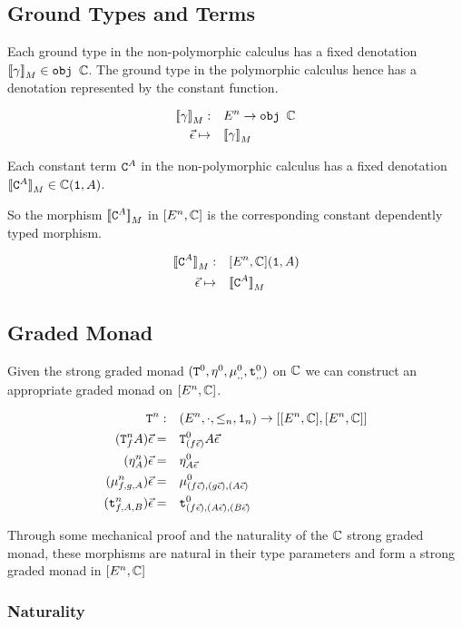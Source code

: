 \documentclass{report}
\begin{document}
\subsection{Ground Types and Terms}
Each ground type in the non-polymorphic calculus has a fixed denotation ${\bf [\![}\gamma{\bf ]\!]}_M\in\texttt{obj }\mathbb{C}$. The ground type in the polymorphic calculus hence has a denotation represented by the constant function.

\begin{align}
    {\bf [\![}\gamma{\bf ]\!]}_M:&\quad E^n\rightarrow \texttt{obj }\mathbb{C}\\
    \vec{\epsilon} \mapsto&\quad  {\bf [\![}\gamma{\bf ]\!]}_M\\
\end{align}

Each constant term $\texttt{C}^{A}$ in the non-polymorphic calculus has a fixed denotation ${\bf [\![}\texttt{C}^{A}{\bf ]\!]}_M\in\mathbb{C}(\texttt{1}, A)$.

So the morphism ${\bf [\![}\texttt{C}^{A}{\bf ]\!]}_M$ in $[E^n, \mathbb{C}]$ is the corresponding constant dependently typed morphism.

\begin{align}
    {\bf [\![}\texttt{C}^{A}{\bf ]\!]}_M:&\quad[E^n, \mathbb{C}](\texttt{1}, A)\\
    \vec{\epsilon}\mapsto&\quad{\bf [\![}\texttt{C}^{A}{\bf ]\!]}_M
\end{align}

\subsection{Graded Monad}
Given the strong graded monad $(\texttt{T}^0_{}, \eta_{}^0{}{}, \mu_{, , }^0, \texttt{t}_{, , }^0)$ on $\mathbb{C}$ we can construct an appropriate graded monad on $[E^n, \mathbb{C}]$.

\begin{align}
    \texttt{T}^n_{}:&\quad(E^n, \cdot, \leq_n, \texttt{1}_n) \rightarrow [[E^n, \mathbb{C}], [E^n, \mathbb{C}]]\\
    (\texttt{T}^n_{f}A)\vec{\epsilon}=&\quad \texttt{T}^0_{(f\vec{\epsilon})}A\vec{\epsilon}\\
    (\eta_{A}^n)\vec{\epsilon}=&\quad\eta_{A\vec{\epsilon}}^0\\
    (\mu_{f, g, A}^n)\vec{\epsilon}=&\quad\mu_{(f\vec{\epsilon}), (g\vec{\epsilon}), (A\vec{\epsilon})}^0\\
    (\texttt{t}_{f, A, B}^n)\vec{\epsilon}=&\quad\texttt{t}_{(f\vec{\epsilon}), (A\vec{\epsilon}), (B\vec{\epsilon})}^0
\end{align}

Through some mechanical proof and the naturality of the $\mathbb{C}$ strong graded monad, these morphisms are natural in their type parameters and form a strong graded monad in $[E^n, \mathbb{C}]$


\subsubsection{Naturality}
\end{document}
